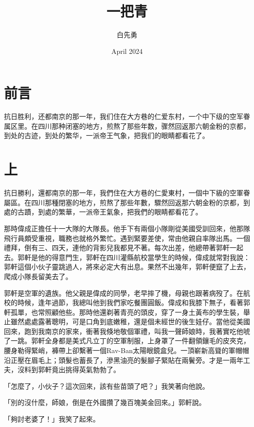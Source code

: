 \documentclass[b5paper,11pt,twoside,twocolumn]{ctexbook}
\title{\fontsize{18}{19}\selectfont 一把青}
\author{白先勇}
\date{April 2024}
\begin{document}
\maketitle

\clearpage

\tableofcontents

\onecolumn
\frontmatter
\chapter{前言}

抗日胜利，还都南京的那一年，我们住在大方巷的仁爱东村，一个中下级的空军眷属区里。在四川那种闭塞的地方，煎熬了那些年数，骤然回返那六朝金粉的京都，到处的古迹，到处的繁华，一派帝王气象，把我们的眼睛都看花了。
\mainmatter
\twocolumn

\chapter{上}

抗日勝利，還都南京的那一年，我們住在大方巷的仁愛東村，一個中下級的空軍眷屬區。在四川那種閉塞的地方，煎熬了那些年數，驟然回返那六朝金粉的京都，到處的古蹟，到處的繁華，一派帝王氣象，把我們的眼睛都看花了。

那時偉成正擔任十一大隊的大隊長。他手下有兩個小隊剛從美國受訓回來，他那隊飛行員頗受重視，職務也就格外繁忙。遇到緊要差使，常由他親自率隊出馬。一個禮拜，倒有三、四天，連他的背影兒我都見不著。每次出差，他總帶著郭軒一起去。郭軒是他的得意門生，郭軒在四川灌縣航校當學生的時候，偉成就常對我說：郭軒這個小伙子靈跳過人，將來必定大有出息。果然不出幾年，郭軒便竄了上去，爬成小隊長留美去了。

郭軒是空軍的遺族。他父親是偉成的同學，老早摔了機，母親也跟著病歿了。在航校的時候，逢年過節，我總叫他到我們家吃餐團圓飯。偉成和我膝下無子，看著郭軒孤單，也常照顧他些。那時他還剃著青亮的頭皮，穿了一身土黃布的學生裝，舉止雖然處處露著聰明，可是口角到底嫩稚，還是個未經世的後生娃仔。當他從美國回來，跑到我南京的家來，衝著我倏地敬個軍禮，叫我一聲師娘時，我著實吃他唬了一跳。郭軒全身都是美式凡立丁的空軍制服，上身罩了一件翻領鑲毛的皮夾克，腰身勒得緊峭，褲帶上卻繫著一個Rav-Ban太陽眼鏡盒兒。一頂嶄新高聳的軍帽帽沿正壓在眉毛上；頭髮也蓄長了，滲黑油亮的髮腳子緊貼在兩鬢旁。才是一兩年工夫，沒料到郭軒竟出挑得英氣勃勃了。

「怎麼了，小伙子？這次回來，該有些苗頭了吧？」我笑著向他說。

「別的沒什麼，師娘，倒是在外國攢了幾百塊美金回來。」郭軒說。

「夠討老婆了！」我笑了起來。
\end{document}
